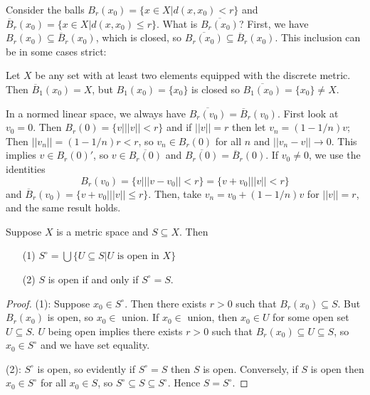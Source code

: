 \begin{eg}
    Consider the balls $B_r(x_0) = \{x \in X\vert d(x,x_0) < r\}$ and $\overline{B}_r(x_0) = \{x \in X\vert d(x,x_0) \leq r\}$. What is $\overline{B_r(x_0)}$? First, we have $B_r(x_0) \subseteq \overline{B}_r(x_0)$, which is closed, so $\overline{B_r(x_0)} \subseteq \overline{B}_r(x_0)$. This inclusion can be in some cases strict:

    Let $X$ be any set with at least two elements equipped with the discrete metric. Then $\overline{B}_1(x_0) = X$, but $B_1(x_0) = \{x_0\}$ is closed so $\overline{B_1(x_0)} = \{x_0\} \neq X$. 

    In a normed linear space, we always have $\overline{B_r(v_0)} = \overline{B}_r(v_0)$. First look at $v_0 = 0$. Then $B_r(0) = \{v \vert ||v|| < r\}$ and if $||v|| = r$ then let $v_n = (1-1/n)v$; Then $||v_n|| = (1-1/n)r < r$, so $v_n \in B_r(0)$ for all $n$ and $||v_n-v||\rightarrow 0$. This implies $v \in B_r(0)'$, so $v \in \overline{B_r(0)}$ and $\overline{B_r(0)} = \overline{B}_r(0)$. If $v_0\neq 0$, we use the identities $$B_r(v_0) = \{v\vert ||v-v_0|| < r\} = \{v+v_0\vert ||v|| < r\}$$ and $\overline{B}_r(v_0) = \{v+v_0\vert ||v|| \leq r\}$. Then, take $v_n = v_0 + (1-1/n)v$ for $||v|| = r$, and the same result holds.
\end{eg}


\begin{prop}
    Suppose $X$ is a metric space and $S \subseteq X$. Then \begin{itemize}
        \item[(1)] $S^{\circ} = \bigcup\{U\subseteq S\vert \text{$U$ is open in $X$}\}$
        \item[(2)] $S$ is open if and only if $S^{\circ} = S$.
    \end{itemize}
\end{prop}
\begin{proof}
    (1): Suppose $x_0 \in S^{\circ}$. Then there exists $r > 0$ such that $B_r(x_0) \subseteq S$. But $B_r(x_0)$ is open, so $x_0 \in $ union. If $x_0 \in $ union, then $x_0 \in U$ for some open set $U \subseteq S$. $U$ being open implies there exists $r > 0$ such that $B_r(x_0) \subseteq U \subseteq S$, so $x_0 \in S^{\circ}$ and we have set equality.

    (2): $S^{\circ}$ is open, so evidently if $S^{\circ} =S$ then $S$ is open. Conversely, if $S$ is open then $x_0 \in S^{\circ}$ for all $x_0 \in S$, so $S^{\circ} \subseteq S \subseteq S^{\circ}$. Hence $S = S^{\circ}$.
\end{proof} 

